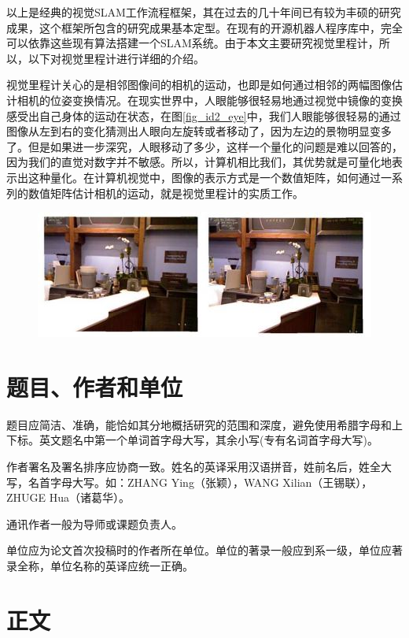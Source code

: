\documentclass[10.5pt,twocolumn]{jbuaa}
\begin{document}
以上是经典的视觉SLAM工作流程框架，其在过去的几十年间已有较为丰硕的研究成果，这个框架所包含的研究成果基本定型。在现有的开源机器人程序库中，完全可以依靠这些现有算法搭建一个SLAM系统。由于本文主要研究视觉里程计，所以，以下对视觉里程计进行详细的介绍。

视觉里程计关心的是相邻图像间的相机的运动，也即是如何通过相邻的两幅图像估计相机的位姿变换情况。在现实世界中，人眼能够很轻易地通过视觉中镜像的变换感受出自己身体的运动在状态\cite{maer}，在图\ref{fig_id2_eye}中，我们人眼能够很轻易的通过图像从左到右的变化猜测出人眼向左旋转或者移动了，因为左边的景物明显变多了。但是如果进一步深究，人眼移动了多少，这样一个量化的问题是难以回答的，因为我们的直觉对数字并不敏感。所以，计算机相比我们，其优势就是可量化地表示出这种量化。在计算机视觉中，图像的表示方式是一个数值矩阵，如何通过一系列的数值矩阵估计相机的运动，就是视觉里程计的实质工作。

\begin{figure}[h!]
	\centering
	\includegraphics [scale=0.6,trim=0 0 0 0]{./image/eyes_image}
\end{figure}

\section{题目、作者和单位}
\enlargethispage{-3.3cm}
题目应简洁、准确，能恰如其分地概括研究的范围和深度，避免使用希腊字母和上下标。英文题名中第一个单词首字母大写，其余小写(专有名词首字母大写)。

作者署名及署名排序应协商一致。姓名的英译采用汉语拼音，姓前名后，姓全大写，名首字母大写。如：ZHANG Ying（张颖），WANG Xilian（王锡联），ZHUGE Hua（诸葛华）。

通讯作者一般为导师或课题负责人。

单位应为论文首次投稿时的作者所在单位。单位的著录一般应到系一级，单位应著录全称，单位名称的英译应统一正确。

\section{正文}
\end{document}
